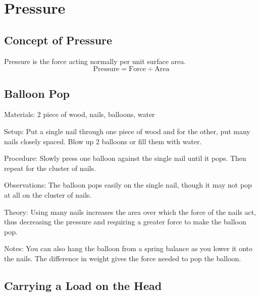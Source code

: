 \section{Pressure}
\label{sec:pressure}

\begin{multicols}{2}


\section*{Concept of Pressure}
Pressure is the force acting normally per unit surface area. $$\text{Pressure} = \text{Force} \div \text{Area} $$


\subsection{Balloon Pop}


\begin{description*}
\item[Materials:]{2 piece of wood, nails, balloons, water}
\item[Setup:]{Put a single nail through one piece of wood and for the other, put many nails closely spaced. Blow up 2 balloons or fill them with water.}
\item[Procedure:]{Slowly press one balloon against the single nail until it pops. Then repeat for the cluster of nails.}
\item[Observations:]{The balloon pops easily on the single nail, though it may not pop at all on the cluster of nails.}
\item[Theory:]{Using many nails increases the area over which the force of the nails act, thus decreasing the pressure and requiring a greater force to make the balloon pop.}
\item[Notes:]{You can also hang the balloon from a spring balance as you lower it onto the nails. The difference in weight gives the force needed to pop the balloon.}
\end{description*}

\subsection{Carrying a Load on the Head}


\end{multicols}
